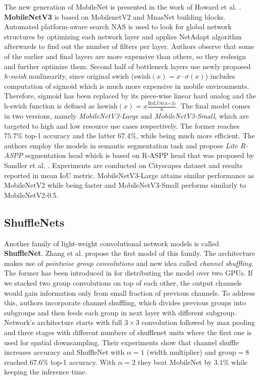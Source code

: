 \vspace{5mm}
The new generation of MobileNet is presented in the work of Howard et al.
\cite{bib:howard2019searching}. \textbf{MobileNetV3} is based on MobilenetV2 and MnasNet
\cite{bib:tan2019mnasnet} building blocks.
Automated platform-aware search NAS is used to look for global
network structures by optimizing each network layer and applies NetAdapt algorithm afterwards
to find out the number of filters per layer. Authors observe that some of the earlier
and final layers are more expensive than others, so they redesign and further optimize
them. Second half of bottleneck layers use newly proposed \textit{h-swish} nonlinearity,
since original swish ($\textrm{swish}(x) = x\cdot \sigma(x)$) includes computation of
sigmoid which is much more expensive in mobile environments.
Therefore, sigmoid has been replaced by its piece-wise linear hard analog and the h-swish 
function is defined as $\textrm{hswish}(x) = x\frac{\textrm{ReLU6(x+3)}}{6}$.
The final model comes in two versions, namely \textit{MobileNetV3-Large} and 
\textit{MobileNetV3-Small}, which are targeted to high and low resource use cases respectively.
The former reaches $75.7\%$ top-1 accuracy and the latter $67.4\%$, while being much more
efficient. The authors employ the models in semantic segmentation task and propose
\textit{Lite R-ASPP} segmentation head which is based on R-ASPP head that was proposed
by Sandler et al. \cite{bib:sandler2018mobilenetv2}. Experiments
are conducted on Cityscapes dataset \cite{bib:cordts2016cityscapes} and results
reported in mean IoU metric. MobileNetV3-Large attains similar performance as MobileNetV2
while being faster and MobileNetV3-Small performs similarly to MobileNetV2-0.5.

\subsection{ShuffleNets}
\label{sec:mobile_models:shufflenet}

Another family of light-weight convolutional network models is called \textbf{ShuffleNet}.
Zhang et al. \cite{bib:zhang2018shufflenet} propose the first model of this family.
The architecture makes use of \textit{pointwise group convolutions} and new idea
called \textit{channel shuffling}. The former has been introduced in
\cite{bib:krizhevsky2012imagenet} for distributing the model over two GPUs. If we stacked
two group convolutions on top of each other, the output channels would gain information
only from small fraction of previous channels. To address this, authors incorporate
channel shuffling, which divides previous groups into subgroups and then feeds each group
in next layer with different subgroup. Network's architecture starts with full $3\times 3$
convolution followed by max pooling and three stages with different numbers of shufflenet units
where the first one is used for spatial downsampling. Their experiments show that
channel shuffle increases accuracy and ShuffleNet with $\alpha=1$ (width multiplier) and
$\textrm{group}=8$ reached $67.6\%$ top-1 accuracy. With $\alpha=2$ they beat MobileNet
by $3.1\%$ while keeping the inference time.

